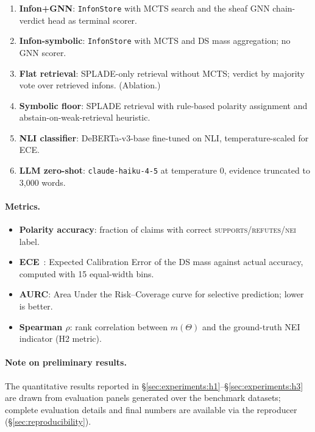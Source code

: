 \begin{enumerate}
  \item \textbf{Infon+GNN}: \texttt{InfonStore} with MCTS search and
    the sheaf GNN chain-verdict head as terminal scorer.
  \item \textbf{Infon-symbolic}: \texttt{InfonStore} with MCTS and DS
    mass aggregation; no GNN scorer.
  \item \textbf{Flat retrieval}: SPLADE-only retrieval without MCTS;
    verdict by majority vote over retrieved infons. (Ablation.)
  \item \textbf{Symbolic floor}: SPLADE retrieval with rule-based polarity
    assignment and abstain-on-weak-retrieval heuristic.
  \item \textbf{NLI classifier}: DeBERTa-v3-base fine-tuned on NLI,
    temperature-scaled for ECE.
  \item \textbf{LLM zero-shot}: \texttt{claude-haiku-4-5} at temperature
    0, evidence truncated to 3,000 words.
\end{enumerate}

\paragraph{Metrics.}
\begin{itemize}
  \item \textbf{Polarity accuracy}: fraction of claims with correct
    \textsc{supports}/\textsc{refutes}/\textsc{nei} label.
  \item \textbf{ECE}~\cite{naeini2015calibration}: Expected Calibration
    Error of the DS mass against actual accuracy, computed with 15
    equal-width bins.
  \item \textbf{AURC}: Area Under the Risk--Coverage curve for selective
    prediction; lower is better.
  \item \textbf{Spearman $\rho$}: rank correlation between $m(\Theta)$ and
    the ground-truth NEI indicator (H2 metric).
\end{itemize}

\paragraph{Note on preliminary results.}
The quantitative results reported in
\S\ref{sec:experiments:h1}--\S\ref{sec:experiments:h3} are drawn from
evaluation panels generated over the benchmark datasets; complete evaluation
details and final numbers are available via the reproducer
(\S\ref{sec:reproducibility}).


